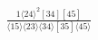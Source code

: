 \documentclass[varwidth, border=5pt]{standalone}
\begin{document}
\begin{my}
$\begin{gathered}
\scriptscriptstyle\frac{1⟨24⟩^2[34][45]}{⟨15⟩⟨23⟩⟨34⟩[35]⟨45⟩}
\end{gathered}$
\end{my}
\end{document}

